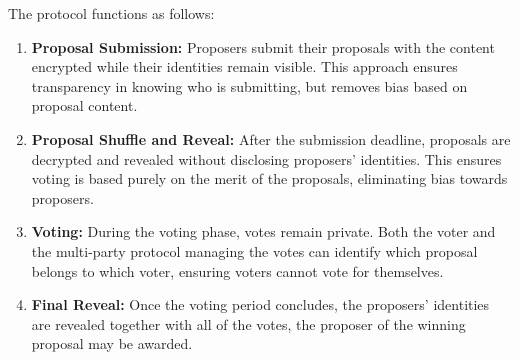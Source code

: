 \documentclass{article}
\begin{document}
\begin{CJK}{UTF8}{gbsn}
\begin{multicols}{2}
            The protocol functions as follows:
            \begin{enumerate}[nosep]
                \item \textbf{Proposal Submission:} Proposers submit their proposals with the content encrypted while their identities remain visible. This approach ensures transparency in knowing who is submitting, but removes bias based on proposal content.
                 \item \textbf{Proposal Shuffle and Reveal:} After the submission deadline, proposals are decrypted and revealed without disclosing proposers' identities. This ensures voting is based purely on the merit of the proposals, eliminating bias towards proposers.
                 \item \textbf{Voting:} During the voting phase, votes remain private. Both the voter and the multi-party protocol managing the votes can identify which proposal belongs to which voter, ensuring voters cannot vote for themselves.
                 \item \textbf{Final Reveal:} Once the voting period concludes, the proposers' identities are revealed together with all of the votes, the proposer of the winning proposal may be awarded.
            \end{enumerate}




\end{multicols}
\end{CJK}
\end{document}
